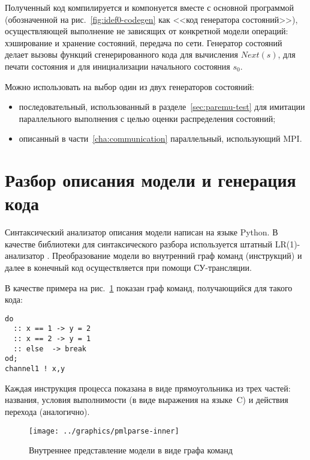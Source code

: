 Полученный код компилируется и компонуется вместе с основной программой (обозначенной на
рис.~\ref{fig:idef0-codegen} как <<код генератора состояний>>), осуществляющей выполнение
не зависящих от конкретной модели операций: хэширование и хранение состояний, передача по
сети\etc. Генератор состояний делает вызовы функций сгенерированного кода для вычисления
$Next(s)$, для печати состояния и для инициализации начального состояния $s_0$.

Можно использовать на выбор один из двух генераторов состояний: 

\begin{itemize}
\item последовательный, использованный в разделе~\ref{sec:paremu-test} для имитации параллельного
  выполнения с целью оценки распределения состояний;
\item описанный в части~\ref{cha:communication} параллельный, использующий MPI.
\end{itemize}

\section{Разбор описания модели и генерация кода}
\label{sec:promela-parser}

Синтаксический анализатор описания модели написан на языке Python. В качестве библиотеки
для синтаксического разбора используется штатный LR(1)-анализатор
. Преобразование модели во внутренний граф команд (инструкций) и далее в
конечный код осуществляется при помощи СУ-трансляции.

В качестве примера на рис.~\ref{fig:pmlparse-inner} показан граф команд, получающийся для
такого кода:
\begin{lstlisting}[language=Promela]
do
  :: x == 1 -> y = 2
  :: x == 2 -> y = 1
  :: else  -> break
od;
channel1 ! x,y
\end{lstlisting}

Каждая инструкция процесса показана в виде прямоугольника из трех частей: названия,
условия выполнимости  (в виде выражения на языке~C) и действия перехода
 (аналогично). 

\begin{figure}[ht]
  \centering
  \texttt{[image: ../graphics/pmlparse-inner]}
  \caption{Внутреннее представление модели в виде графа команд}
  \label{fig:pmlparse-inner}
\end{figure}

